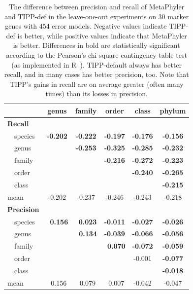 \begin{table}[hptb]
\caption[Precision-Recall Differences on 30 marker genes, 454]{\label{tipp:difference.leaveout.454.30} The difference between precision and recall of MetaPhyler and TIPP-def in the leave-one-out experiments on 30 marker genes with 454 error models. Negative values
indicate TIPP-def is better, while positive values indicate that MetaPhyler is better. Differences in bold are statistically significant according to the Pearson's chi-square contingency table test (as implemented in R~\cite{R}). 
TIPP-default always has better recall, and in many cases has better precision, too. 
Note that TIPP's gains in recall are on average greater (often many times) than its losses in precision.}
\begin{center}
\begin{tabular}{|l||c|c|c|c|c|} \hline
\multicolumn{1}{|l||}{}&\multicolumn{1}{c|}{genus}&\multicolumn{1}{c|}{family}&\multicolumn{1}{c|}{order}&\multicolumn{1}{c|}{class}&\multicolumn{1}{c|}{phylum}\\ \hline
{\bf Recall}&&&&&\\
~~species&{\bf -0.202}&{\bf -0.222}&{\bf -0.197}&{\bf -0.176}&{\bf -0.156}\\ 
~~genus&&{\bf -0.253}&{\bf -0.325}&{\bf -0.285}&{\bf -0.232}\\ 
~~family&&&{\bf -0.216}&{\bf -0.272}&{\bf -0.223}\\ 
~~order&&&&{\bf -0.240}&{\bf -0.265}\\ 
~~class&&&&&{\bf -0.215}\\ 
mean&-0.202&-0.237&-0.246&-0.243&-0.218\\ \hline
{\bf Precision}&&&&&\\
~~species&{\bf ~0.156}&~{\bf 0.023}&{\bf -0.011}&{\bf -0.027}&{\bf -0.026}\\ 
~~genus&&{\bf ~0.134}&{\bf -0.039}&{\bf -0.066}&{\bf -0.056}\\ 
~~family&&&~{\bf 0.070}&{\bf -0.072}&{\bf -0.059}\\ 
~~order&&&&-0.001&{\bf -0.077}\\ 
~~class&&&&&{\bf -0.018}\\ 
mean&~0.156&~0.079&~0.007&-0.042&-0.047\\ 
\hline
\end{tabular}
\end{center}
\end{table}

